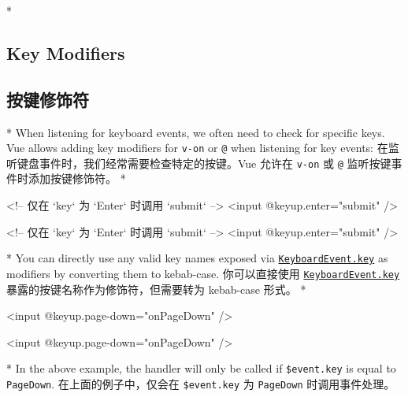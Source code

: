 \begin{paracol}{2}

\switchcolumn[0]*%
\subsection{Key Modifiers}
\switchcolumn
\subsection{按键修饰符}
\switchcolumn[0]*%
When listening for keyboard events, we often need to check for specific
keys. Vue allows adding key modifiers for \texttt{v-on} or \texttt{@}
when listening for key events:
\switchcolumn
在监听键盘事件时，我们经常需要检查特定的按键。Vue 允许在 \texttt{v-on}
或 \texttt{@} 监听按键事件时添加按键修饰符。
\switchcolumn[0]*%
\begin{codeHtml}
<!-- 仅在 `key` 为 `Enter` 时调用 `submit` -->
<input @keyup.enter="submit" />
\end{codeHtml}
\switchcolumn
\begin{codeHtml}
<!-- 仅在 `key` 为 `Enter` 时调用 `submit` -->
<input @keyup.enter="submit" />
\end{codeHtml}
\switchcolumn[0]*%
You can directly use any valid key names exposed via
\href{https://developer.mozilla.org/en-US/docs/Web/API/KeyboardEvent/key/Key_Values}{\texttt{KeyboardEvent.key}}
as modifiers by converting them to kebab-case.
\switchcolumn
你可以直接使用
\href{https://developer.mozilla.org/zh-CN/docs/Web/API/KeyboardEvent/key/Key_Values}{\texttt{KeyboardEvent.key}}
暴露的按键名称作为修饰符，但需要转为 kebab-case 形式。
\switchcolumn[0]*%
\begin{codeHtml}
<input @keyup.page-down="onPageDown" />
\end{codeHtml}
\switchcolumn
\begin{codeHtml}
<input @keyup.page-down="onPageDown" />
\end{codeHtml}
\switchcolumn[0]*%
In the above example, the handler will only be called if
\texttt{\$event.key} is equal to
\texttt{\textquotesingle{}PageDown\textquotesingle{}}.
\switchcolumn
在上面的例子中，仅会在 \texttt{\$event.key} 为
\texttt{\textquotesingle{}PageDown\textquotesingle{}} 时调用事件处理。
\end{paracol}


